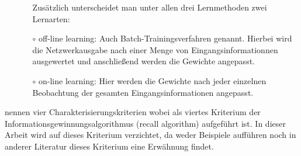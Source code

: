 \begin{enumerate}
\begin{itemize}
Zusätzlich unterscheidet man unter allen drei Lernmethoden zwei Lernarten: 
\item[$\circ$]%
off-line learning: Auch Batch-Trainingsverfahren genannt. Hierbei wird die Netzwerkausgabe nach einer Menge von Eingangsinformationnen ausgewertet und anschließend werden die Gewichte angepasst.

\item[$\circ$]%
on-line learning: Hier werden die Gewichte nach jeder einzelnen Beobachtung der gesamten Eingangsinformationen angepasst. 

\end{itemize}

\end{enumerate}

\citet{characterisation_4} nennen vier Charakterisierungskriterien wobei als viertes Kriterium der Informationsgewinnungsalgorithmus (recall algorithm) aufgeführt ist. In dieser Arbeit wird auf dieses Kriterium verzichtet, da weder \citet{characterisation_4} Beispiele aufführen noch in anderer Literatur dieses Kriterium eine Erwähnung findet.







